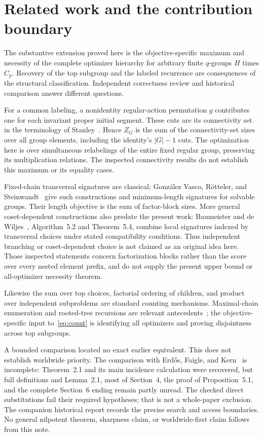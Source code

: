 \documentclass[11pt,letterpaper]{article}
\theoremstyle{definition}
\begin{document}
\section{Related work and the contribution boundary}
The substantive extension proved here is the objective-specific maximum and necessity of the complete optimizer hierarchy for arbitrary finite $q$-groups $H$ times $C_p$. Recovery of the top subgroup and the labeled recurrence are consequences of the structural classification. Independent correctness review and historical comparison answer different questions.

For a common labeling, a nonidentity regular-action permutation $g$ contributes one for each invariant proper initial segment. These cuts are its connectivity set in the terminology of Stanley~\cite{stanley}. Hence $Z_G$ is the sum of the connectivity-set sizes over all group elements, including the identity's $|G|-1$ cuts. The optimization here is over simultaneous relabelings of the entire fixed regular group, preserving its multiplication relations. The inspected connectivity results do not establish this maximum or its equality cases.

Fixed-chain transversal signatures are classical; Gonz\'alez Vasco, R\"otteler, and Steinwandt~\cite{gvs} give such constructions and minimum-length signatures for solvable groups. Their length objective is the sum of factor-block sizes. More general coset-dependent constructions also predate the present work: Baumeister and de Wiljes~\cite{bdw}, Algorithm~5.2 and Theorem~5.4, combine local signatures indexed by transversal choices under stated compatibility conditions. Thus independent branching or coset-dependent choice is not claimed as an original idea here. Those inspected statements concern factorization blocks rather than the score over every nested element prefix, and do not supply the present upper bound or all-optimizer necessity theorem.

Likewise the sum over top choices, factorial ordering of children, and product over independent subproblems are standard counting mechanisms. Maximal-chain enumeration and rooted-tree recursions are relevant antecedents~\cite{st,mbkk}; the objective-specific input to~\eqref{eq:count} is identifying all optimizers and proving disjointness across top subgroups.

A bounded comparison located no exact earlier equivalent. This does not establish worldwide priority. The comparison with Erd\H{o}s, Faigle, and Kern~\cite{efk} is incomplete: Theorem~2.1 and its main incidence calculation were recovered, but full definitions and Lemma~2.1, most of Section~4, the proof of Proposition~5.1, and the complete Section~6 ending remain partly unread. The checked direct substitutions fail their required hypotheses; that is not a whole-paper exclusion. The companion historical report records the precise search and access boundaries. No general nilpotent theorem, sharpness claim, or worldwide-first claim follows from this note.
\end{document}
